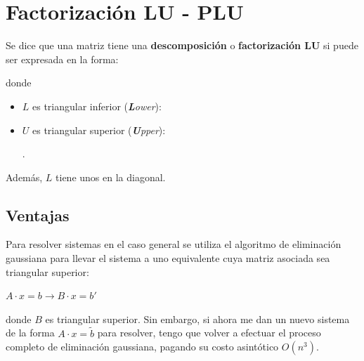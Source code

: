 \documentclass[]{article}
\begin{document}
\section{Factorización LU - PLU}
Se dice que una matriz tiene una \textbf{descomposición} o \textbf{factorización LU} si puede ser expresada en la forma:
\begin{center}
\end{center}
donde
\begin{itemize}
	\item $L$ es triangular inferior (\emph{\textbf{L}ower}):
	\begin{center}
	\end{center}
	\item $U$ es triangular superior (\emph{\textbf{U}pper}):
	\begin{center}
		.
	\end{center}
\end{itemize}

Además, $L$ tiene unos en la diagonal.

\subsection{Ventajas}
Para resolver sistemas en el caso general se utiliza el algoritmo de eliminación gaussiana para llevar el sistema a uno equivalente cuya matriz asociada sea triangular superior:
\begin{center}
	$A\cdot x = b \longrightarrow B\cdot x = b'$
\end{center}
donde $B$ es triangular superior. Sin embargo, si ahora me dan un nuevo sistema de la forma $A\cdot x = \tilde b$ para resolver, tengo que volver a efectuar el proceso completo de eliminación gaussiana, pagando su costo asintótico $O(n^3)$.
\end{document}
